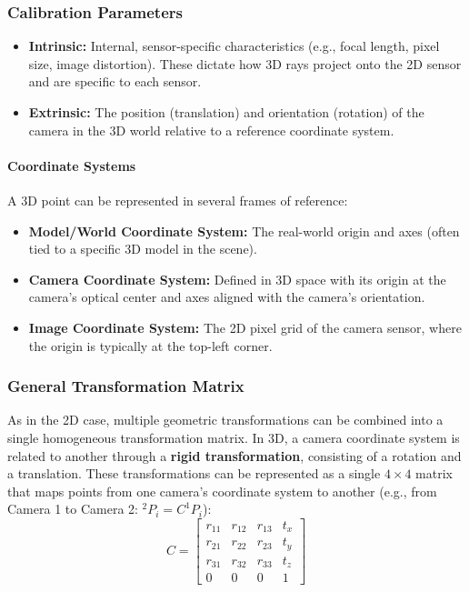 \subsubsection{Calibration Parameters}
\begin{itemize}
    \item \textbf{Intrinsic:} Internal, sensor-specific characteristics (e.g., focal length, pixel size, image distortion). 
    These dictate how 3D rays project onto the 2D sensor and are specific to each sensor.
    \item \textbf{Extrinsic:} The position (translation) and orientation (rotation) of the camera in the 
    3D world relative to a reference coordinate system.
\end{itemize}

\paragraph{Coordinate Systems}
A 3D point can be represented in several frames of reference:
\begin{itemize}
    \item \textbf{Model/World Coordinate System:} The real-world origin and axes (often tied to a specific 3D model in the scene).
    \item \textbf{Camera Coordinate System:} Defined in 3D space with its origin at the camera's optical center and axes aligned with the camera's orientation.
    \item \textbf{Image Coordinate System:} The 2D pixel grid of the camera sensor, where the origin is typically at the top-left corner.
\end{itemize}


\subsubsection{General Transformation Matrix}
As in the 2D case, multiple geometric transformations can be combined into a single homogeneous transformation matrix.
In 3D, a camera coordinate system is related to another through a \textbf{rigid transformation}, consisting of a rotation and a translation.
These transformations can be represented as a single $4 \times 4$ matrix that maps points from one camera's coordinate system to another 
(e.g., from Camera 1 to Camera 2: $^2P_i = C ^1P_i$):
$$ C = \begin{bmatrix}
r_{11} & r_{12} & r_{13} & t_x \\
r_{21} & r_{22} & r_{23} & t_y \\
r_{31} & r_{32} & r_{33} & t_z \\
0 & 0 & 0 & 1
\end{bmatrix} $$

